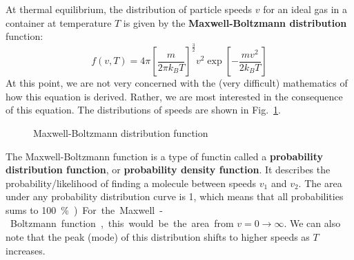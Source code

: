 At thermal equilibrium, the distribution of particle speeds $v$ for an ideal
gas in a container at temperature $T$ is given by the
\textbf{Maxwell-Boltzmann distribution} function:
\begin{equation}
  f(v,T)=4\pi\left[\frac m{2\pi k_BT}\right]^{\frac32}v^2
  \exp\left[-\frac{mv^2}{2k_BT}\right]
\end{equation}
At this point, we are not very concerned with the (very difficult) mathematics
of how this equation is derived. Rather, we are most interested in the
consequence of this equation. The distributions of speeds are shown in
Fig.~\ref{fig:maxwell-dist}.
%
\begin{figure}[ht]
  \centering
  \caption{Maxwell-Boltzmann distribution function}
  \label{fig:maxwell-dist}
\end{figure}

The Maxwell-Boltzmann function is a type of functin called a
\textbf{probability distribution function}, or
\textbf{probability density function}. It describes the probability/likelihood
of finding a molecule between speeds $v_1$ and $v_2$. The area under any
probability distribution curve is 1, which means that all probabilities sums to
\SI{100}\percent). For the Maxwell-Boltzmann function, this would be the area
from $v=0\rightarrow\infty$. We can also note that the peak (mode) of this
distribution shifts to higher speeds as $T$ increases.

